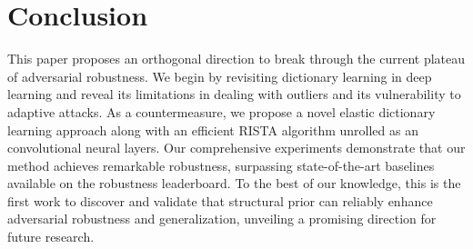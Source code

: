 \section{Conclusion}
This paper proposes an orthogonal direction to break through the current plateau of adversarial robustness. We begin by revisiting dictionary learning in deep learning and reveal its limitations in dealing with outliers 
and its vulnerability to adaptive attacks. 
As a countermeasure, we propose a novel elastic dictionary learning approach along with an efficient RISTA algorithm unrolled as an 
convolutional neural layers. Our comprehensive experiments demonstrate that our method achieves remarkable robustness, surpassing state-of-the-art baselines available on the robustness leaderboard.
To the best of our knowledge, this is the first work to discover and validate that structural prior can reliably enhance adversarial robustness and generalization, unveiling a promising direction for future research. 